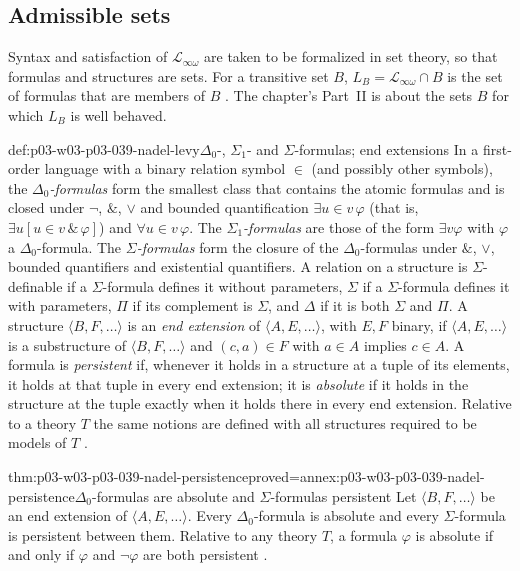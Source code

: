 \subsection{Admissible sets}
\label{sec:p03-w03-p03-039-nadel-admissible}

Syntax and satisfaction of \(\mathscr L_{\infty\omega}\) are taken to be
formalized in set theory, so that formulas and structures are sets. For a
transitive set \(B\), \(L_B=\mathscr L_{\infty\omega}\cap B\) is the set of
formulas that are members of \(B\) \cite[p.~288]{Nadel1985Admissible}. The
chapter's Part~II is about the sets \(B\) for which \(L_B\) is well behaved.

\begin{hbdefinition}{def:p03-w03-p03-039-nadel-levy}{\(\Delta_0\)-, \(\Sigma_1\)- and \(\Sigma\)-formulas; end extensions}
In a first-order language with a binary relation symbol \(\in\) (and possibly
other symbols), the \emph{\(\Delta_0\)-formulas} form the smallest class that
contains the atomic formulas and is closed under \(\neg\), \(\&\), \(\vee\)
and bounded quantification \(\exists u\in v\,\varphi\) (that is,
\(\exists u[u\in v\,\&\,\varphi]\)) and \(\forall u\in v\,\varphi\). The
\emph{\(\Sigma_1\)-formulas} are those of the form \(\exists v\varphi\) with
\(\varphi\) a \(\Delta_0\)-formula. The \emph{\(\Sigma\)-formulas} form the
closure of the \(\Delta_0\)-formulas under \(\&\), \(\vee\), bounded
quantifiers and existential quantifiers. A relation on a structure is
\(\Sigma\)-definable if a \(\Sigma\)-formula defines it without parameters,
\(\Sigma\) if a \(\Sigma\)-formula defines it with parameters, \(\Pi\) if
its complement is \(\Sigma\), and \(\Delta\) if it is both \(\Sigma\) and
\(\Pi\). A structure \(\langle B,F,\dots\rangle\) is an \emph{end extension}
of \(\langle A,E,\dots\rangle\), with \(E,F\) binary, if
\(\langle A,E,\dots\rangle\) is a substructure of \(\langle B,F,\dots\rangle\)
and \((c,a)\in F\) with \(a\in A\) implies \(c\in A\). A formula is
\emph{persistent} if, whenever it holds in a structure at a tuple of its
elements, it holds at that tuple in every end extension; it is
\emph{absolute} if it holds in the structure at the tuple exactly when it
holds there in every end extension. Relative to a theory \(T\) the same
notions are defined with all structures required to be models of \(T\)
\cite[pp.~288--289]{Nadel1985Admissible}.
\end{hbdefinition}

\begin{hblemma}{thm:p03-w03-p03-039-nadel-persistence}{proved=annex:p03-w03-p03-039-nadel-persistence}{\(\Delta_0\)-formulas are absolute and \(\Sigma\)-formulas persistent}
Let \(\langle B,F,\dots\rangle\) be an end extension of
\(\langle A,E,\dots\rangle\). Every \(\Delta_0\)-formula is absolute and
every \(\Sigma\)-formula is persistent between them. Relative to any theory
\(T\), a formula \(\varphi\) is absolute if and only if \(\varphi\) and
\(\neg\varphi\) are both persistent
\cite[p.~289]{Nadel1985Admissible}.
\end{hblemma}

